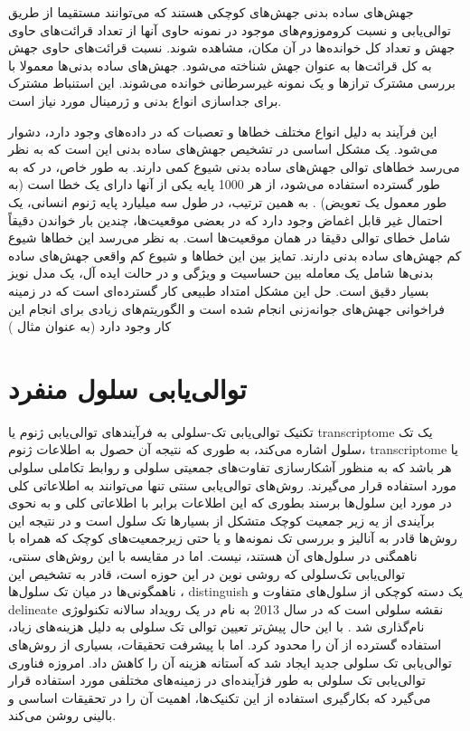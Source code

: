 جهش‌های ساده بدنی جهش‌های کوچکی هستند که می‌توانند مستقیما از طریق توالی‌یابی و نسبت کروموزوم‌های موجود در نمونه حاوی آنها از تعداد قرائت‌های حاوی جهش و تعداد کل خوانده‌ها در آن مکان، مشاهده شوند. نسبت قرائت‌های حاوی جهش به کل قرائت‌ها به عنوان  جهش شناخته می‌شود. جهش‌های ساده بدنی‌ها معمولا با بررسی مشترک ترازها و یک نمونه غیر‌سرطانی خوانده می‌شوند. این استنباط مشترک برای جداسازی انواع بدنی و ژرمینال مورد نیاز است.

این فرآیند به دلیل انواع مختلف خطاها و تعصبات که در داده‌های  وجود دارد، دشوار می‌شود\cite{friedl2010plasticity}. یک مشکل اساسی در تشخیص جهش‌های ساده بدنی این است که به نظر می‌رسد خطاهای توالی جهش‌های ساده بدنی شیوع کمی دارند. به طور خاص، در    که به طور گسترده استفاده می‌شود، از هر 1000 پایه یکی از آنها دارای یک خطا است (به طور معمول یک تعویض) \cite{sabeh2009protease}. به همین ترتیب، در طول سه میلیارد پایه ژنوم انسانی، یک احتمال غیر قابل اغماض وجود دارد که در بعضی موقعیت‌ها، چندین بار خواندن دقیقاً شامل خطای توالی دقیقا در همان موقعیت‌ها است. به نظر می‌رسد این خطاها شیوع کم جهش‌های ساده بدنی دارند. تمایز بین این خطاها و شیوع کم واقعی جهش‌های ساده بدنی‌ها شامل یک معامله بین حساسیت و ویژگی و در حالت ایده آل، یک مدل نویز بسیار دقیق است. حل این مشکل امتداد طبیعی کار گسترده‌ای است که در زمینه فراخوانی جهش‌های جوانه‌زنی انجام شده است و الگوریتم‌های زیادی برای انجام این کار وجود دارد (به عنوان مثال \cite{friedl2010plasticity, demicheli2008effects})

\section{توالی‌یابی سلول منفرد}

تکنیک توالی‌یابی تک-سلولی به فرآیندهای توالی‌یابی ژنوم یا \gls{transcriptome} یک تک سلول اشاره می‌کند، به طوری که نتیجه آن حصول به اطلاعات ژنوم، \gls{transcriptome} یا هر  باشد که به منظور آشکارسازی تفاوت‌های جمعیتی سلولی و روابط تکاملی سلولی مورد استفاده قرار می‌گیرند.
روش‌های توالی‌یابی سنتی تنها می‌توانند به اطلاعاتی کلی در مورد این سلول‌ها برسند بطوری که این اطلاعات برابر با اطلاعاتی کلی و به نحوی برآیندی از یه زیر جمعیت کوچک متشکل از بسیارها تک سلول است و در نتیجه این روش‌ها قادر به آنالیز و بررسی تک نمونه‌ها و یا حتی زیرجمعیت‌های کوچک که همراه با  ناهمگنی در سلول‌های آن هستند، نیست. اما در مقایسه با این روش‌های سنتی، توالی‌یابی تک‌سلولی که روشی نوین در این حوزه است، قادر به تشخیص این ناهمگونی‌ها در میان تک سلول‌ها \cite{wen2018boosting}، \gls{distinguish} یک دسته کوچکی از سلول‌های متفاوت و \gls{delineate} نقشه سلولی است که در سال 2013 به نام  در یک رویداد سالانه تکنولوژی نام‌گذاری شد \cite{pennisi2012single}. 
با این حال پیش‌تر تعیین توالی تک سلولی به دلیل هزینه‌های زیاد، استفاده گسترده از آن را محدود کرد. اما با پیشرفت تحقیقات، بسیاری از روش‌های توالی‌یابی تک سلولی جدید ایجاد شد که آستانه هزینه آن را کاهش داد. امروزه فناوری توالی‌یابی تک سلولی به طور فزآینده‌ای در زمینه‌های مختلفی مورد استفاده قرار می‌گیرد که بکارگیری استفاده از این تکنیک‌ها، اهمیت آن را در تحقیقات اساسی و بالینی روشن می‌کند. 

